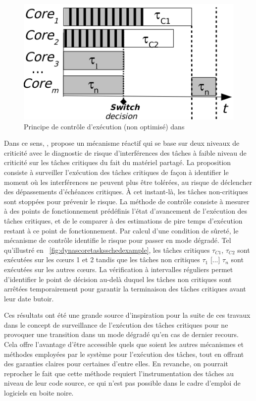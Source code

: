 \documentclass[french, a4paper, 11pt, twoside, pdftex]{StyleThese}
\begin{document}
    \begin{figure}[ht!]
    	\centering
    	\includegraphics[width=0.7\linewidth]{schemas/DYNASCORE_tasks_sched_example}
    	\caption[Principe de contrôle d'exécution DYNASCORE \cite{kritikakou_multiplexing_2016}]{Principe de contrôle d'exécution (non optimisé) dans \cite{kritikakou_multiplexing_2016}}
    	\label{fig:dynascoretasksschedexample}
    \end{figure}
    Dans ce sens, \cite{kritikakou_distributed_2014}, \cite{kritikakou_dynascore_2017} propose un mécanisme réactif qui se base sur deux niveaux de criticité avec le diagnostic de risque d'interférences des tâches à faible niveau de criticité sur les tâches critiques du fait du matériel partagé. La proposition consiste à surveiller l'exécution des tâches critiques de façon à identifier le moment où les interférences ne peuvent plus être tolérées, au risque de déclencher des dépassements d'échéances critiques. À cet instant-là, les tâches non-critiques sont stoppées pour prévenir le risque. La méthode de contrôle consiste à mesurer à des points de fonctionnement prédéfinis l'état d'avancement de l'exécution des tâches critiques, et de le comparer à des estimations de pire temps d'exécution restant à ce point de fonctionnement. Par calcul d'une condition de sûreté, le mécanisme de contrôle identifie le risque  pour passer en mode dégradé. Tel qu'illustré en ~\autoref{fig:dynascoretasksschedexample}, les tâches critiques $\tau_{C1}$, $\tau_{C2}$ sont exécutées sur les cœurs 1 et 2 tandis que les tâches non critiques $\tau_{1}$ [...] $\tau_{n}$ sont exécutées sur les autres cœurs. La vérification à intervalles réguliers permet d'identifier le point de décision au-delà duquel les tâches non critiques sont arrêtées temporairement pour garantir la terminaison des tâches critiques avant leur date butoir.
    

    
    Ces résultats ont été une grande source d'inspiration pour la suite de ces travaux dans le concept de surveillance de l'exécution des tâches critiques pour ne provoquer une transition dans un mode dégradé qu'en cas de dernier recours. Cela offre l'avantage d'être accessible quels que soient les autres mécanismes et méthodes employées par le système pour l'exécution des tâches, tout en offrant des garanties claires pour certaines d'entre elles. En revanche, on pourrait reprocher le fait que cette méthode requiert l'instrumentation des tâches au niveau de leur code source, ce qui n'est pas possible dans le cadre d'emploi de logiciels en boite noire.
\end{document}
